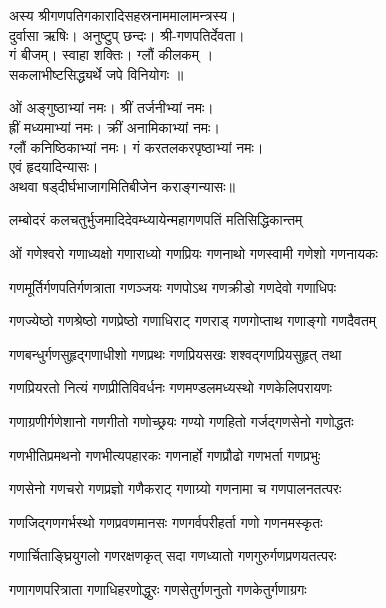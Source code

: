 

अस्य श्रीगणपतिगकारादिसहस्रनाममालामन्त्रस्य।\\
दुर्वासा ऋषिः। अनुष्टुप् छन्दः। श्री-गणपतिर्देवता।\\
गं बीजम्। स्वाहा शक्तिः। ग्लौं कीलकम् ।\\
 सकलाभीष्टसिद्ध्यर्थे जपे विनियोगः ॥

ओं अङ्गुष्ठाभ्यां नमः। श्रीं तर्जनीभ्यां नमः।\\
ह्रीं मध्यमाभ्यां नमः। क्रीं अनामिकाभ्यां नमः।\\
ग्लौं कनिष्ठिकाभ्यां नमः। गं करतलकरपृष्ठाभ्यां नमः।\\
एवं हृदयादिन्यासः।\\
अथवा षड्दीर्घभाजागमितिबीजेन कराङ्गन्यासः॥


{लम्बोदरं कलचतुर्भुजमादिदेवम्}{ध्यायेन्महागणपतिं मतिसिद्धिकान्तम्}


\twolineshloka
{ओं गणेश्वरो गणाध्यक्षो गणाराध्यो गणप्रियः}
{गणनाथो गणस्वामी गणेशो गणनायकः}%

\twolineshloka
{गणमूर्तिर्गणपतिर्गणत्राता गणञ्जयः}%
{गणपोऽथ गणक्रीडो गणदेवो गणाधिपः}%

\twolineshloka
{गणज्येष्ठो गणश्रेष्ठो गणप्रेष्ठो गणाधिराट्}%
{गणराड् गणगोप्ताथ गणाङ्गो गणदैवतम्}%

\twolineshloka
{गणबन्धुर्गणसुहृद्गणाधीशो गणप्रथः}%
{गणप्रियसखः शश्वद्गणप्रियसुहृत् तथा}%

\twolineshloka
{गणप्रियरतो नित्यं गणप्रीतिविवर्धनः}%
{गणमण्डलमध्यस्थो गणकेलिपरायणः}%

\twolineshloka
{गणाग्रणीर्गणेशानो गणगीतो गणोच्छ्रयः}%
{गण्यो गणहितो गर्जद्गणसेनो गणोद्धतः}%

\twolineshloka
{गणभीतिप्रमथनो गणभीत्यपहारकः}%
{गणनार्हो गणप्रौढो गणभर्ता गणप्रभुः}%

\twolineshloka
{गणसेनो गणचरो गणप्रज्ञो गणैकराट्}%
{गणाग्र्यो गणनामा च गणपालनतत्परः}%

\twolineshloka
{गणजिद्गणगर्भस्थो गणप्रवणमानसः}%
{गणगर्वपरीहर्ता गणो गणनमस्कृतः}%

\twolineshloka
{गणार्चिताङ्घ्रियुगलो गणरक्षणकृत् सदा}%
{गणध्यातो गणगुरुर्गणप्रणयतत्परः}%

\twolineshloka
{गणागणपरित्राता गणाधिहरणोद्धुरः}%
{गणसेतुर्गणनुतो गणकेतुर्गणाग्रगः}%

